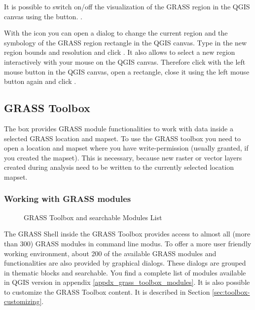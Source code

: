 It is possible to switch on/off the visualization of the GRASS region in the
QGIS canvas using the 
button. .

With the  icon you 
can open a dialog to change the current region and the symbology of the GRASS region rectangle in the QGIS canvas. Type in the new region bounds and 
resolution and click . It also allows to select a new region interactively with your mouse on the QGIS canvas. Therefore click with the left mouse button in the QGIS canvas, open a rectangle, close it using the left mouse button again and click . 

\subsection{GRASS Toolbox}

The  box provides GRASS 
module functionalities to work with data inside a selected GRASS location 
and mapset. To use the GRASS toolbox you need to open a location and mapset where 
you have write-permission (usually granted, if you created the mapset). This is 
necessary, because new raster or vector layers created during analysis need to 
be written to the currently selected location mapset.

\subsubsection{Working with GRASS modules}

\begin{figure}[h]
\centering
\caption{GRASS Toolbox and searchable Modules List \nixcaption}\label{fig:grass_modules}
   \goodgap
\end{figure}

The GRASS Shell inside the GRASS Toolbox provides access to almost all (more 
than 300) GRASS modules in command line modus. To offer a more user
friendly working environment, about 200 of the available GRASS modules and 
functionalities are also provided by graphical dialogs. These dialogs are 
grouped in thematic blocks and searchable. You find a complete list of modules 
available in QGIS version \CURRENT in appendix \ref{appdx_grass_toolbox_modules}. 
It is also possible to customize the GRASS Toolbox content. It is described in 
Section \ref{sec:toolbox-customizing}.

